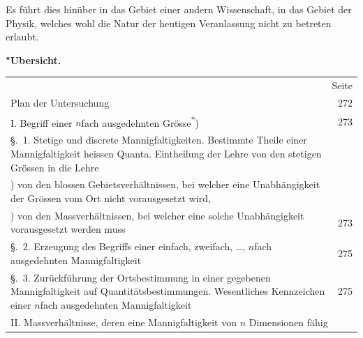 \documentclass[12pt,a4paper]{article}
\begin{document}
Es f\"uhrt dies hin\"uber in das Gebiet einer andern Wissenschaft, in das Gebiet der Physik, welches wohl die Natur der heutigen Veranlassung nicht zu betreten erlaubt.

\medskip
\noindent\textbf{"Ubersicht.}

\begin{center}
\begin{tabular}{p{10cm}r}
\multicolumn{2}{r}{Seite} \\[2mm]
Plan der Untersuchung & 272 \\[1mm]
I. Begriff einer $n$fach ausgedehnten Gr\"osse\textsuperscript{*}) & 273 \\[1mm]
\quad \S.~1. Stetige und discrete Mannigfaltigkeiten. Bestimmte Theile einer Mannigfaltigkeit heissen Quanta. Eintheilung der Lehre von den stetigen Gr\"ossen in die Lehre & \\[1mm]
\quad 1) von den blossen Gebietsverh\"altnissen, bei welcher eine Unabh\"angigkeit der Gr\"ossen vom Ort nicht vorausgesetzt wird, & \\[1mm]
\quad 2) von den Massverh\"altnissen, bei welcher eine solche Unabh\"angigkeit vorausgesetzt werden muss & 273 \\[2mm]
\quad \S.~2. Erzeugung des Begriffs einer einfach, zweifach, \dots, $n$fach ausgedehnten Mannigfaltigkeit & 275 \\[1mm]
\quad \S.~3. Zur\"uckf\"uhrung der Ortsbestimmung in einer gegebenen Mannigfaltigkeit auf Quantit\"atsbestimmungen. Wesentliches Kennzeichen einer $n$fach ausgedehnten Mannigfaltigkeit & 275 \\[2mm]
II. Massverh\"altnisse, deren eine Mannigfaltigkeit von $n$ Dimensionen f\"ahig
\end{tabular}
\end{center}
\end{document}

